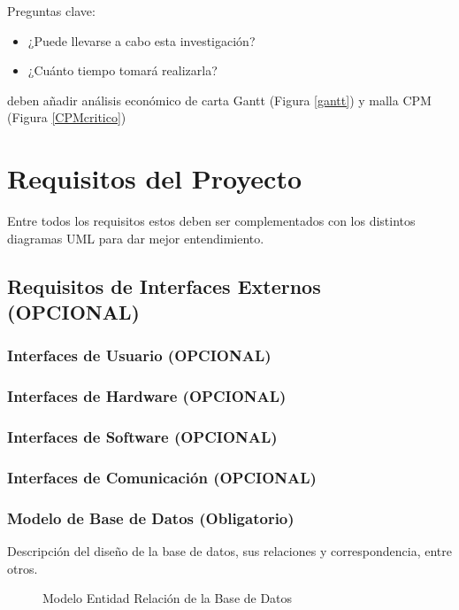 \documentclass[letter,12pt]{report}
\newcommand\rojo[1]{\textcolor[rgb]{1,0,0}{#1}}
\begin{document}
Preguntas clave:
  \begin{itemize}\justifying
  \item ¿Puede llevarse a cabo esta investigación?
  \item ¿Cuánto tiempo tomará realizarla?
\end{itemize}

deben añadir análisis económico de carta Gantt (Figura \ref{gantt}) y malla CPM (Figura \ref{CPMcritico})




\chapter{Requisitos del Proyecto}\label{requisitos}
Entre todos los requisitos estos deben ser complementados con los distintos diagramas UML para dar mejor entendimiento.
\section{Requisitos de Interfaces Externos (\rojo{OPCIONAL})}
\subsection{Interfaces de Usuario (\rojo{OPCIONAL})}
\subsection{Interfaces de Hardware (\rojo{OPCIONAL})}
\subsection{Interfaces de Software (\rojo{OPCIONAL})}
\subsection{Interfaces de Comunicación (\rojo{OPCIONAL})}


\subsection{Modelo de Base de Datos (\rojo{Obligatorio})}
Descripción del diseño de la base de datos, sus relaciones y correspondencia, entre otros.

\begin{landscape}
\begin{figure}[hbt]
  \centering
  \caption{Modelo Entidad Relación de la Base de Datos}
  \label{MER}
\end{figure}
\end{landscape}
\end{document}
